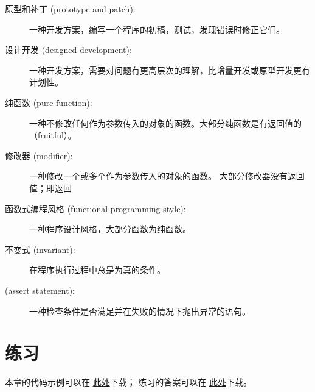 {\begin{description}

\item[原型和补丁 (prototype and patch):]
一种开发方案，编写一个程序的初稿，测试，发现错误时修正它们。

\item[设计开发 (designed development):]
一种开发方案，需要对问题有更高层次的理解，比增量开发或原型开发更有计划性。

\item[纯函数 (pure function):] 一种不修改任何作为参数传入的对象的函数。大部分纯函数是有返回值的（fruitful）。

\item[修改器 (modifier):]
一种修改一个或多个作为参数传入的对象的函数。
大部分修改器没有返回值；即返回 

\item[函数式编程风格 (functional programming style):]
一种程序设计风格，大部分函数为纯函数。

\item[不变式 (invariant):]
在程序执行过程中总是为真的条件。

\item[(assert statement):]
一种检查条件是否满足并在失败的情况下抛出异常的语句。
  

\end{description}

\section{练习}

本章的代码示例可以在 \href{http://thinkpython2.com/code/Time1.py}{此处}下载；
练习的答案可以在 \href{http://thinkpython2.com/code/Time1_soln.py}{此处}下载。

\begin{exercise}



\end{exercise}}
